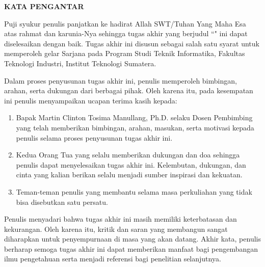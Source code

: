 \clearpage
{}%

\begin{justifying}
	\large \bfseries \centering \MakeUppercase{Kata Pengantar}\linebreak
	
	\normalsize \normalfont \justifying
	Puji syukur penulis panjatkan ke hadirat Allah SWT/Tuhan Yang Maha Esa atas rahmat dan karunia-Nya sehingga tugas akhir yang berjudul “{\thetitle}" ini dapat diselesaikan dengan baik. Tugas akhir ini disusun sebagai salah satu syarat untuk memperoleh gelar Sarjana pada Program Studi Teknik Informatika, Fakultas Teknologi Industri, Institut Teknologi Sumatera.
	
	Dalam proses penyusunan tugas akhir ini, penulis memperoleh bimbingan, arahan, serta dukungan dari berbagai pihak. Oleh karena itu, pada kesempatan ini penulis menyampaikan ucapan terima kasih kepada:

	\begin{enumerate}
		\item Bapak Martin Clinton Tosima Manullang, Ph.D. selaku Dosen Pembimbing yang telah memberikan bimbingan, arahan, masukan, serta motivasi kepada penulis selama proses penyusunan tugas akhir ini.
		\item Kedua Orang Tua yang selalu memberikan dukungan dan doa sehingga penulis dapat menyelesaikan tugas akhir ini. Kelembutan, dukungan, dan cinta yang kalian berikan selalu menjadi sumber inspirasi dan kekuatan.
		\item Teman-teman penulis yang membantu selama masa perkuliahan yang tidak bisa disebutkan satu persatu.
	\end{enumerate}
	
	Penulis menyadari bahwa tugas akhir ini masih memiliki keterbatasan dan kekurangan. Oleh karena itu, kritik dan saran yang membangun sangat diharapkan untuk penyempurnaan di masa yang akan datang. Akhir kata, penulis berharap semoga tugas akhir ini dapat memberikan manfaat bagi pengembangan ilmu pengetahuan serta menjadi referensi bagi penelitian selanjutnya.
	
	\vfill
\end{justifying}
\clearpage





